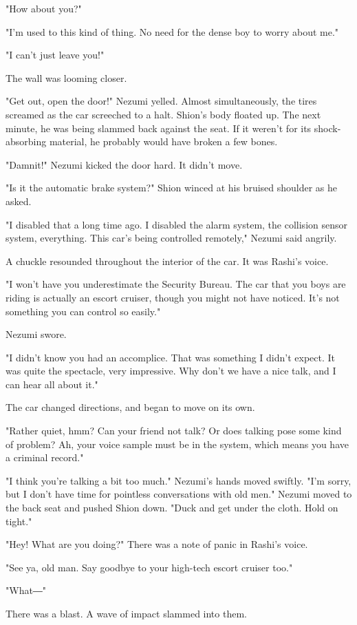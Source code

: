 "How about you?"

"I'm used to this kind of thing. No need for the dense boy to worry
about me."

"I can't just leave you!"

The wall was looming closer.

"Get out, open the door!" Nezumi yelled. Almost simultaneously, the
tires screamed as the car screeched to a halt. Shion's body floated up.
The next minute, he was being slammed back against the seat. If it
weren't for its shock-absorbing material, he probably would have broken
a few bones.

"Damnit!" Nezumi kicked the door hard. It didn't move.

"Is it the automatic brake system?" Shion winced at his bruised shoulder
as he asked.

"I disabled that a long time ago. I disabled the alarm system, the
collision sensor system, everything. This car's being controlled
remotely," Nezumi said angrily.

A chuckle resounded throughout the interior of the car. It was Rashi's
voice.

"I won't have you underestimate the Security Bureau. The car that you
boys are riding is actually an escort cruiser, though you might not have
noticed. It's not something you can control so easily."

Nezumi swore.

"I didn't know you had an accomplice. That was something I didn't
expect. It was quite the spectacle, very impressive. Why don't we have a
nice talk, and I can hear all about it."

The car changed directions, and began to move on its own.

"Rather quiet, hmm? Can your friend not talk? Or does talking pose some
kind of problem? Ah, your voice sample must be in the system, which
means you have a criminal record."

"I think you're talking a bit too much." Nezumi's hands moved swiftly.
"I'm sorry, but I don't have time for pointless conversations with old
men." Nezumi moved to the back seat and pushed Shion down. "Duck and get
under the cloth. Hold on tight."

"Hey! What are you doing?" There was a note of panic in Rashi's voice.

"See ya, old man. Say goodbye to your high-tech escort cruiser too."

"What―"

There was a blast. A wave of impact slammed into them.

